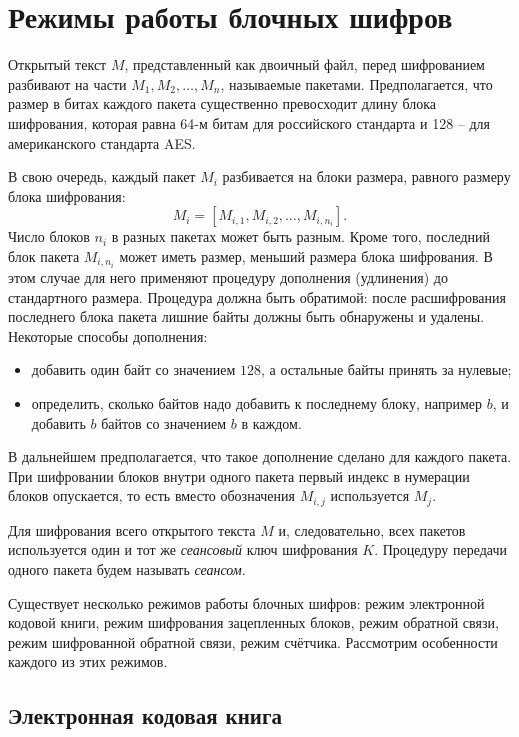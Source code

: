 \section{Режимы работы блочных шифров}\label{section-block-chaining}

Открытый текст $M$, представленный как двоичный файл, перед шифрованием разбивают на части $M_1, M_2, \dots, M_n$, называемые пакетами. Предполагается, что размер в битах каждого пакета существенно превосходит длину блока шифрования, которая равна 64-м битам для российского стандарта и 128 -- для американского стандарта AES.

В свою очередь, каждый пакет $M_i$ разбивается на блоки размера, равного размеру блока шифрования:
    \[ M_i = \left[ M_{i,1}, M_{i,2}, \dots, M_{i,n_i} \right]. \]
Число блоков $n_i$ в разных пакетах может быть разным. Кроме того, последний блок пакета $M_{i,n_i}$ может иметь размер, меньший размера блока шифрования. В этом случае для него применяют процедуру дополнения (удлинения) до стандартного размера. Процедура должна быть обратимой: после расшифрования последнего блока пакета лишние байты должны быть обнаружены и удалены. Некоторые способы дополнения:
\begin{itemize}
  \item добавить один байт со значением $128$, а остальные байты принять за нулевые;
  \item определить, сколько байтов надо добавить к последнему блоку, например $b$, и добавить $b$ байтов со значением $b$ в каждом.
\end{itemize}
В дальнейшем предполагается, что такое дополнение сделано для каждого пакета. При шифровании блоков внутри одного пакета первый индекс в нумерации блоков опускается, то есть вместо обозначения $M_{i,j}$ используется $M_j$.

Для шифрования всего открытого текста $M$ и, следовательно, всех пакетов используется один и тот же \emph{сеансовый} ключ шифрования $K$. Процедуру передачи одного пакета будем называть \emph{сеансом}.

Существует несколько режимов работы блочных шифров: режим электронной кодовой книги, режим шифрования зацепленных блоков, режим обратной связи, режим шифрованной обратной связи, режим счётчика. Рассмотрим особенности каждого из этих режимов.


\subsection{Электронная кодовая книга}

